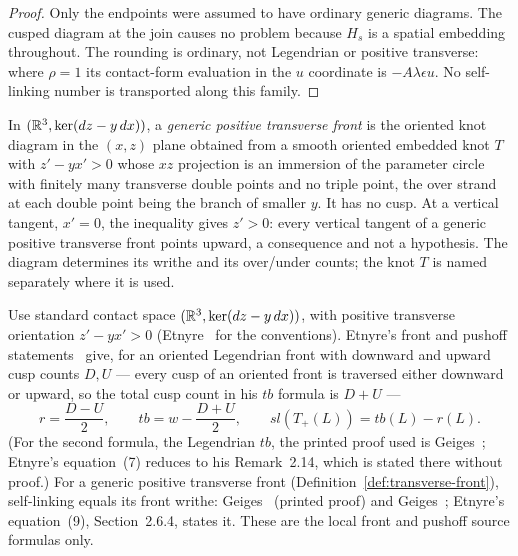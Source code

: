 \begin{proof}
Only the endpoints were assumed to have ordinary generic diagrams. The
cusped diagram at the join causes no problem because $H_s$ is a spatial
embedding throughout. The rounding is ordinary, not Legendrian or
positive transverse: where $\rho=1$ its contact-form evaluation in the
$u$ coordinate is $-A\lambda\epsilon u$. No self-linking number is
transported along this family.
\end{proof}

\begin{definition}\label{def:transverse-front}
In $(\mathbb R^3,\ker(dz-y\,dx))$, a \emph{generic positive transverse front} is
the oriented knot diagram in the $(x,z)$ plane obtained from a smooth oriented
embedded knot $T$ with $z'-yx'>0$ whose $xz$ projection is an immersion of
the parameter circle with finitely many transverse double points and no
triple point, the over strand at each double point being the branch of
smaller $y$. It has no cusp. At a vertical tangent, $x'=0$, the inequality
gives $z'>0$: every vertical tangent of a generic positive transverse front
points upward, a consequence and not a hypothesis. The diagram determines
its writhe and its over/under counts; the knot $T$ is named separately where
it is used.
\end{definition}

\begin{literature}\label{src:contact}
Use standard contact space
$(\mathbb R^3,\ker(dz-y\,dx))$, with positive transverse orientation
$z'-yx'>0$ (Etnyre~\cite[Sections~2.1 and~2.4]{Etnyre} for the
conventions). Etnyre's front and pushoff
statements~\cite[Section~2.6.2, equations~(5) and~(7); Section~2.6.4,
equation~(9); Section~2.9, Lemma~2.22, equation~(17)]{Etnyre} give, for
an oriented Legendrian front with downward and upward cusp counts $D,U$
--- every cusp of an oriented front is traversed either downward or
upward, so the total cusp count in his $tb$ formula is $D+U$ ---
\begin{equation}\label{fd:contact-inputs}
 r=\frac{D-U}{2},\qquad tb=w-\frac{D+U}{2},\qquad
 sl(T_+(L))=tb(L)-r(L).
\end{equation}
(For the second formula, the Legendrian $tb$, the printed proof used is
Geiges~\cite[Proposition~3.5.9, p.~117]{Geiges}; Etnyre's equation~(7)
reduces to his Remark~2.14, which is stated there without proof.)
For a generic positive transverse front
(Definition~\ref{def:transverse-front}), self-linking equals its front
writhe: Geiges~\cite[Section~3.1, Lemma~3.3, p.~46]{GeigesContact} (printed
proof) and Geiges~\cite[Proposition~3.5.32, p.~127]{Geiges}; Etnyre's
equation~(9), Section~2.6.4, states it. These are the local front and
pushoff source formulas only.
\end{literature}

